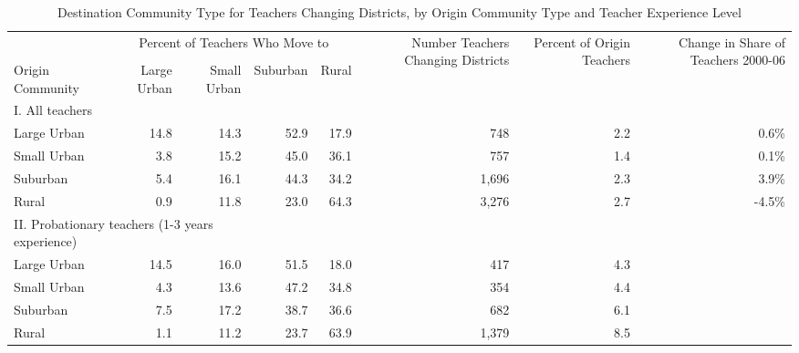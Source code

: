 \documentclass[]{article}
\begin{document}
\begin{sidewaystable}[ht]
\centering
\begin{tabular}{lrrrrrrr}
  \hline
 & \multicolumn{4}{c}{\multirow{2}{*}{Percent of Teachers Who Move to}} & \multirow{4}{*}{\parbox{0.13\linewidth}{Number Teachers Changing Districts}} & \multirow{4}{*}{\parbox{0.12\linewidth}{Percent of Origin Teachers}} & \multirow{4}{*}{\parbox{0.16\linewidth}{Change in Share of Teachers 2000-06}}\\
 & \multicolumn{4}{c}{} & & & \\ \cline{2-5}
& & & & & & & \\
Origin Community & Large Urban & Small Urban & Suburban & Rural &  &  &  \\ 
  \hline
I. All teachers & & & & & & & \\
\quad Large Urban & 14.8 & 14.3 & 52.9 & 17.9 & 748 & 2.2 & 0.6\% \\ 
  \quad Small Urban & 3.8 & 15.2 & 45.0 & 36.1 & 757 & 1.4 & 0.1\% \\ 
  \quad Suburban & 5.4 & 16.1 & 44.3 & 34.2 & 1,696 & 2.3 & 3.9\% \\ 
  \quad Rural & 0.9 & 11.8 & 23.0 & 64.3 & 3,276 & 2.7 & -4.5\% \\ 
\multicolumn{3}{l}{II. Probationary teachers (1-3 years experience)} & & & & & \\
  \quad Large Urban & 14.5 & 16.0 & 51.5 & 18.0 & 417 & 4.3 &  \\ 
  \quad Small Urban & 4.3 & 13.6 & 47.2 & 34.8 & 354 & 4.4 &  \\ 
  \quad Suburban & 7.5 & 17.2 & 38.7 & 36.6 & 682 & 6.1 &  \\ 
  \quad Rural & 1.1 & 11.2 & 23.7 & 63.9 & 1,379 & 8.5 &  \\ 
   \hline
\end{tabular}
\caption{Destination Community Type for Teachers Changing Districts, by Origin Community Type and Teacher Experience Level} 
\label{tbl:markov}
\end{sidewaystable}
\end{document}
